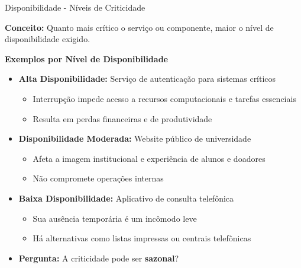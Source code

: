 \begin{frame}{Disponibilidade - Níveis de Criticidade}

\textbf{Conceito:} Quanto mais crítico o serviço ou componente, maior o nível de disponibilidade exigido.

\vspace{0.5em}
\begin{block}{\textbf{Exemplos por Nível de Disponibilidade}}
\begin{itemize}
  \item \textbf{Alta Disponibilidade:} Serviço de autenticação para sistemas críticos
  \begin{itemize}
    \item Interrupção impede acesso a recursos computacionais e tarefas essenciais
    \item Resulta em perdas financeiras e de produtividade
  \end{itemize}

  \item \textbf{Disponibilidade Moderada:} Website público de universidade
  \begin{itemize}
    \item Afeta a imagem institucional e experiência de alunos e doadores
    \item Não compromete operações internas
  \end{itemize}

  \item \textbf{Baixa Disponibilidade:} Aplicativo de consulta telefônica
  \begin{itemize}
    \item Sua ausência temporária é um incômodo leve
    \item Há alternativas como listas impressas ou centrais telefônicas
  \end{itemize}
\end{itemize}
\end{block}

\begin{itemize}
    \item \textbf{Pergunta:} A criticidade pode ser \textbf{sazonal}?
\end{itemize}

\end{frame}




